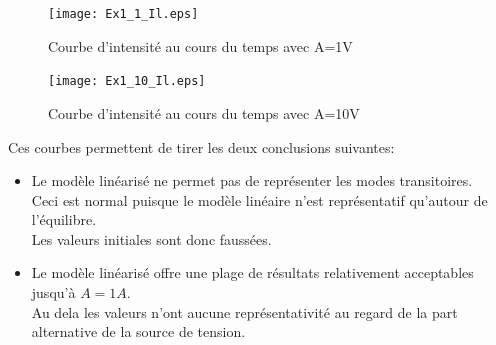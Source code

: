 \documentclass[a4paper,12pt,fleqn]{article}
\begin{document}
\begin{enumerate}
\begin{figure}
  \centering   
    \texttt{[image: Ex1\_1\_Il.eps]}
	\caption{Courbe d'intensité au cours du temps avec A=1V}
\end{figure}

\begin{figure}
  \centering   
    \texttt{[image: Ex1\_10\_Il.eps]}
	\caption{Courbe d'intensité au cours du temps avec A=10V}
\end{figure}

\FloatBarrier
\newpage
Ces courbes permettent de tirer les deux conclusions suivantes:

\begin{itemize}
  \item Le modèle linéarisé ne permet pas de représenter les modes transitoires.\\ Ceci est normal puisque le modèle linéaire n'est représentatif qu'autour de l'équilibre.\\ Les valeurs initiales sont donc faussées.
  \item Le modèle linéarisé offre une plage de résultats relativement acceptables jusqu'à $A=1A$.\\ Au dela les valeurs n'ont aucune représentativité au regard de la part alternative de la source de tension.
\end{itemize}
\end{enumerate}

\newpage
\end{document}
